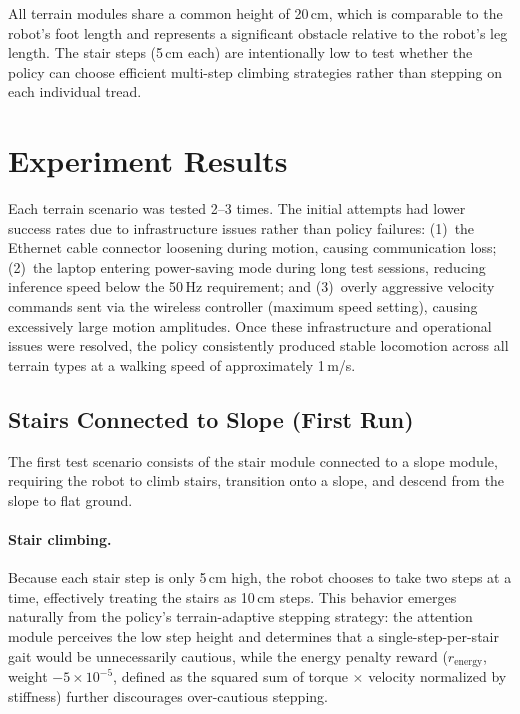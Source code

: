 All terrain modules share a common height of 20\,cm, which is comparable to the robot's foot length and represents a significant obstacle relative to the robot's leg length. The stair steps (5\,cm each) are intentionally low to test whether the policy can choose efficient multi-step climbing strategies rather than stepping on each individual tread.

\section{Experiment Results}
\label{sec:real_results}

Each terrain scenario was tested 2--3 times. The initial attempts had lower success rates due to infrastructure issues rather than policy failures: (1)~the Ethernet cable connector loosening during motion, causing communication loss; (2)~the laptop entering power-saving mode during long test sessions, reducing inference speed below the 50\,Hz requirement; and (3)~overly aggressive velocity commands sent via the wireless controller (maximum speed setting), causing excessively large motion amplitudes. Once these infrastructure and operational issues were resolved, the policy consistently produced stable locomotion across all terrain types at a walking speed of approximately 1\,m/s.

\subsection{Stairs Connected to Slope (First Run)}
\label{sec:stair_slope_first}

The first test scenario consists of the stair module connected to a slope module, requiring the robot to climb stairs, transition onto a slope, and descend from the slope to flat ground.

\paragraph{Stair climbing.}
Because each stair step is only 5\,cm high, the robot chooses to take two steps at a time, effectively treating the stairs as 10\,cm steps. This behavior emerges naturally from the policy's terrain-adaptive stepping strategy: the attention module perceives the low step height and determines that a single-step-per-stair gait would be unnecessarily cautious, while the energy penalty reward ($r_{\mathrm{energy}}$, weight $-5 \times 10^{-5}$, defined as the squared sum of torque $\times$ velocity normalized by stiffness) further discourages over-cautious stepping.

